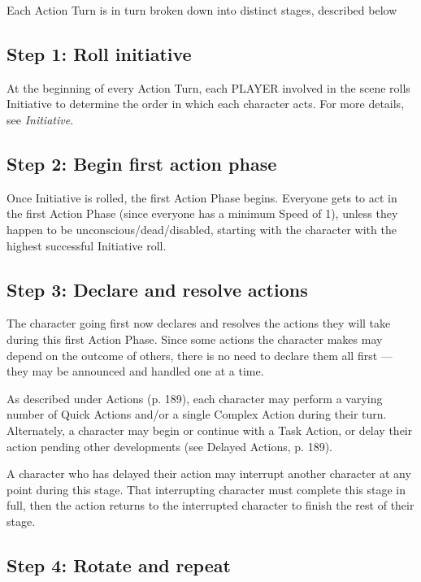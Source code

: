 Each Action Turn is in turn broken down into distinct stages, described below


\subsection{Step 1: Roll initiative}
\label{sec:roll-initiative}

At the beginning of every Action Turn, each PLAYER involved in the scene rolls Initiative to determine the order in which each character acts. For more details, see \emph{Initiative}.


\subsection{Step 2: Begin first action phase}
\label{sec:begin-first-phase}

Once Initiative is rolled, the first Action Phase begins. Everyone gets to act in the first Action Phase (since everyone has a minimum Speed of 1), unless they happen to be unconscious/dead/disabled, starting with the character with the highest successful Initiative roll.


\subsection{Step 3: Declare and resolve actions}
\label{sec:declare-resolve}

The character going first now declares and resolves the actions they will take during this first Action Phase. Since some actions the character makes may depend on the outcome of others, there is no need to declare them all first --- they may be announced and handled one at a time.

As described under Actions (p. 189), each character may perform a varying number of Quick Actions and/or a single Complex Action during their turn. Alternately, a character may begin or continue with a Task Action, or delay their action pending other developments (see Delayed Actions, p. 189).

A character who has delayed their action may interrupt another character at any point during this stage. That interrupting character must complete this stage in full, then the action returns to the interrupted character to finish the rest of their stage.


\subsection{Step 4: Rotate and repeat}
\label{sec:rotate-repeat}

